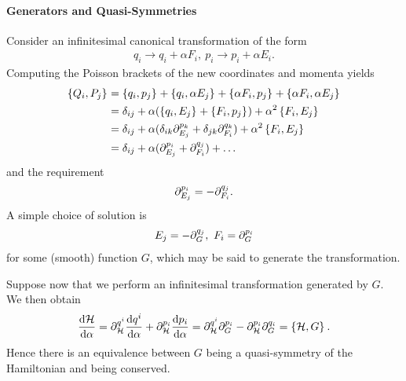 
\paragraph{Generators and Quasi-Symmetries}
Consider an infinitesimal canonical transformation of the form
\begin{align*}
	q_{i} \to q_{i} + \alpha F_{i},\ p_{i} \to p_{i} + \alpha E_{i}.
\end{align*}
Computing the Poisson brackets of the new coordinates and momenta yields
\begin{align*}
	\left\{Q_{i}, P_{j}\right\}_{} &= \left\{q_{i}, p_{j}\right\}_{} + \left\{q_{i}, \alpha E_{j}\right\}_{} + \left\{\alpha F_{i}, p_{j}\right\}_{} + \left\{\alpha F_{i}, \alpha E_{j}\right\}_{} \\
                       &= \delta_{ij} + \alpha(\left\{q_{i}, E_{j}\right\}_{} + \left\{F_{i}, p_{j}\right\}_{}) + \alpha^{2}\left\{F_{i}, E_{j}\right\}_{} \\
                       &= \delta_{ij} + \alpha(\delta_{ik}\partial^{p_{k}}_{E_{j}} + \delta_{jk}\partial^{q_{k}}_{F_{i}}) + \alpha^{2}\left\{F_{i}, E_{j}\right\}_{} \\
                       &= \delta_{ij} + \alpha(\partial^{p_{i}}_{E_{j}} + \partial^{q_{j}}_{F_{i}}) + \dots
\end{align*}
and the requirement
\begin{align*}
	\partial^{p_{i}}_{E_{j}} = -\partial^{q_{j}}_{F_{i}}.
\end{align*}
A simple choice of solution is
\begin{align*}
	E_{j} = -\partial^{q_{j}}_{G},\ F_{i} = \partial^{p_{i}}_{G}
\end{align*}
for some (smooth) function $G$, which  may be said to generate the transformation.


Suppose now that we perform an infinitesimal transformation generated by $G$. We then obtain
\begin{align*}
	\dv{\ensuremath{\mathcal{H}}}{\alpha} = \partial^{q^{i}}_{\mathcal{H}}\dv{q^{i}}{\alpha} + \partial^{p_{i}}_{\mathcal{H}}\dv{p_{i}}{\alpha} = \partial^{q^{i}}_{\mathcal{H}}\partial^{p_{i}}_{G} - \partial^{p_{i}}_{\mathcal{H}}\partial^{q_{i}}_{G} = \left\{\mathcal{H}, G\right\}_{}.
\end{align*}
Hence there is an equivalence between $G$ being a quasi-symmetry of the Hamiltonian and being conserved.

